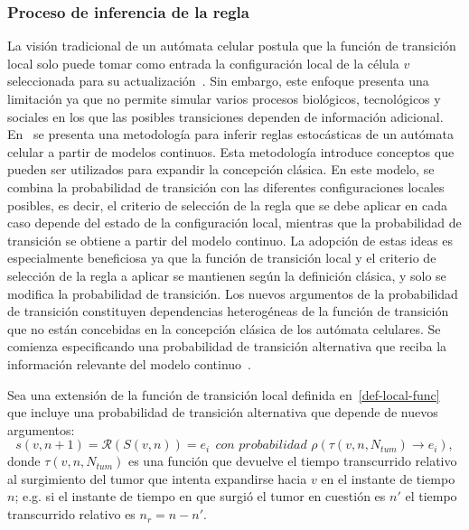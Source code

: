 \subsubsection{Proceso de inferencia de la regla}
La visión tradicional de un autómata celular postula que la función de transición local solo puede tomar como entrada la configuración local de la célula $v$ seleccionada para su actualización~\cite{book}. Sin embargo, este enfoque presenta una limitación ya que no permite simular varios procesos biológicos, tecnológicos y sociales en los que las posibles transiciones dependen de información adicional. En~\cite{guinot} se presenta una metodología para inferir reglas estocásticas de un autómata celular a partir de modelos continuos. Esta metodología introduce conceptos que pueden ser utilizados para expandir la concepción clásica. En este modelo, se combina la probabilidad de transición con las diferentes configuraciones locales posibles, es decir, el criterio de selección de la regla que se debe aplicar en cada caso depende del estado de la configuración local, mientras que la probabilidad de transición se obtiene a partir del modelo continuo. La adopción de estas ideas es especialmente beneficiosa ya que la función de transición local y el criterio de selección de la regla a aplicar se mantienen según la definición clásica, y solo se modifica la probabilidad de transición. Los nuevos argumentos de la probabilidad de transición constituyen dependencias heterogéneas de la función de transición que no están concebidas en la concepción clásica de los autómata celulares. Se comienza especificando una probabilidad de transición alternativa que reciba la información relevante del modelo continuo~\cite{guinot}.

\begin{definition}
\label{prop-newlocal-func}
Sea una extensi\'on de la funci\'on de transici\'on local definida en~\ref{def-local-func} que incluye una probabilidad de transici\'on alternativa que depende de nuevos argumentos:
\begin{equation}
s(v,n+1) = \mathcal{R}(S(v,n)) = e_i~~\textit{con probabilidad } \rho(\tau(v,n,N_{tum}) \rightarrow e_i), \label{eq-newlocal-func}
\end{equation}
donde $\tau(v,n,N_{tum})$ es una funci\'on que devuelve el tiempo transcurrido relativo al surgimiento del tumor que intenta expandirse hacia $v$ en el instante de tiempo $n$; e.g. si el instante de tiempo en que surgi\'o el tumor en cuesti\'on es $n'$ el tiempo transcurrido relativo es $n_r = n - n'$. 
\end{definition}

